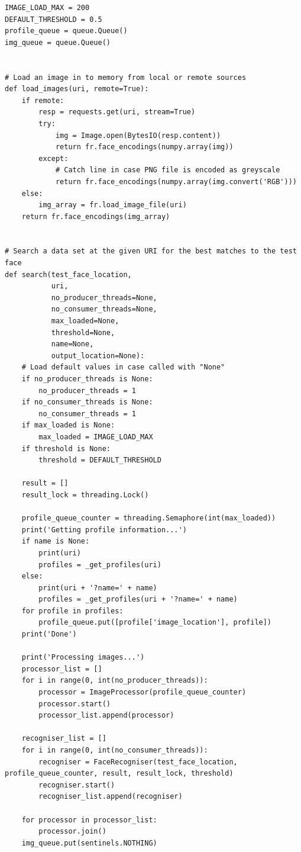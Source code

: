 \documentclass[12pt]{article}
\begin{document}
\begin{appendices}
\begin{lstlisting}
IMAGE_LOAD_MAX = 200
DEFAULT_THRESHOLD = 0.5
profile_queue = queue.Queue()
img_queue = queue.Queue()


# Load an image in to memory from local or remote sources
def load_images(uri, remote=True):
    if remote:
        resp = requests.get(uri, stream=True)
        try:
            img = Image.open(BytesIO(resp.content))
            return fr.face_encodings(numpy.array(img))
        except:
            # Catch line in case PNG file is encoded as greyscale
            return fr.face_encodings(numpy.array(img.convert('RGB')))
    else:
        img_array = fr.load_image_file(uri)
    return fr.face_encodings(img_array)


# Search a data set at the given URI for the best matches to the test face
def search(test_face_location,
           uri,
           no_producer_threads=None,
           no_consumer_threads=None,
           max_loaded=None,
           threshold=None,
           name=None,
           output_location=None):
    # Load default values in case called with "None"
    if no_producer_threads is None:
        no_producer_threads = 1
    if no_consumer_threads is None:
        no_consumer_threads = 1
    if max_loaded is None:
        max_loaded = IMAGE_LOAD_MAX
    if threshold is None:
        threshold = DEFAULT_THRESHOLD

    result = []
    result_lock = threading.Lock()

    profile_queue_counter = threading.Semaphore(int(max_loaded))
    print('Getting profile information...')
    if name is None:
        print(uri)
        profiles = _get_profiles(uri)
    else:
        print(uri + '?name=' + name)
        profiles = _get_profiles(uri + '?name=' + name)
    for profile in profiles:
        profile_queue.put([profile['image_location'], profile])
    print('Done')

    print('Processing images...')
    processor_list = []
    for i in range(0, int(no_producer_threads)):
        processor = ImageProcessor(profile_queue_counter)
        processor.start()
        processor_list.append(processor)

    recogniser_list = []
    for i in range(0, int(no_consumer_threads)):
        recogniser = FaceRecogniser(test_face_location, profile_queue_counter, result, result_lock, threshold)
        recogniser.start()
        recogniser_list.append(recogniser)

    for processor in processor_list:
        processor.join()
    img_queue.put(sentinels.NOTHING)


\end{lstlisting}
\end{appendices}
\end{document}
